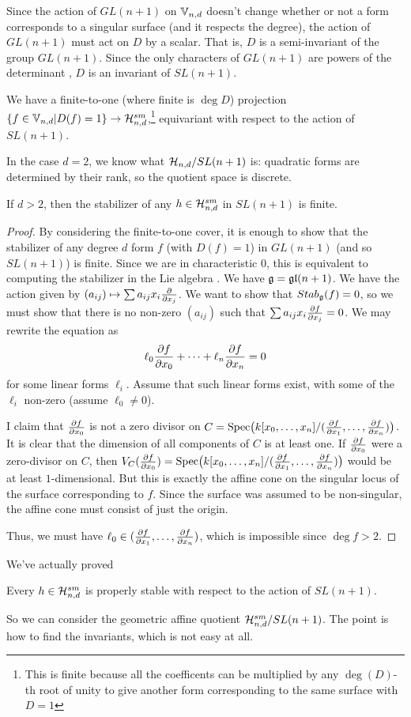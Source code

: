 Since the action of $GL(n+1)$ on $\mathbb{V}_{n,d}$ doesn't change whether or not a form corresponds to a singular surface (and it respects the degree), the action of $GL(n+1)$ must act on $D$ by a scalar. That is, $D$ is a semi-invariant of the group $GL(n+1)$. Since the only characters of $GL(n+1)$ are powers of the determinant , $D$ is an invariant of $SL(n+1)$.

We have a finite-to-one (where finite is $\deg D$) projection $\{f\in \mathbb{V}_{n,d}|D(f)=1\}\to \mathcal{H}_{n,d}^{sm}$,\footnote{This is finite because all the coefficents can be multiplied by any $\deg(D)$-th root of unity to give another form corresponding to the same surface with $D=1$} equivariant with respect to the action of $SL(n+1)$.
\begin{remark}
 In the case $d=2$, we know what $\mathcal{H}_{n,d}/SL(n+1)$ is: quadratic forms are determined by their rank, so the quotient space is discrete.
\end{remark}

\begin{lemma}
 If $d>2$, then the stabilizer of any $h\in \mathcal{H}_{n,d}^{sm}$ in $SL(n+1)$ is finite.
\end{lemma}
\begin{proof}
 By considering the finite-to-one cover, it is enough to show that the stabilizer of any degree $d$ form $f$ (with $D(f)=1$) in $GL(n+1)$ (and so $SL(n+1)$) is finite. Since we are in characteristic 0, this is equivalent to computing the stabilizer in the Lie algebra . We have $\mathfrak{g}=\mathfrak{gl}(n+1)$. We have the action given by $(a_{ij})\mapsto \sum a_{ij} x_i\frac{\partial }{\partial x_j}$. We want to show that $Stab_{\mathfrak{g}}(f)=0$, so we must show that there is no non-zero $(a_{ij})$ such that $\sum a_{ij}x_i \frac{\partial f}{\partial x_j}=0$. We may rewrite the equation as
 \[
  \ell_0\frac{\partial f}{\partial x_0}+\cdots +\ell_n\frac{\partial f}{\partial x_n}=0
 \]
 for some linear forms $\ell_i$. Assume that such linear forms exist, with some of the $\ell_i$ non-zero (assume $\ell_0\neq 0$).
 
 I claim that $\frac{\partial f}{\partial x_0}$ is not a zero divisor on $C=\operatorname{Spec} \bigl(k[x_0,\dots, x_n]/(\frac{\partial f}{\partial x_1},\dots, \frac{\partial f}{\partial x_n})\bigr)$. It is clear that the dimension of all components of $C$ is at least one. If $\frac{\partial f}{\partial x_0}$ were a zero-divisor on $C$, then $V_C(\frac{\partial f}{\partial x_0})=\operatorname{Spec}\bigl(k[x_0,\dots, x_n]/(\frac{\partial f}{\partial x_1},\dots, \frac{\partial f}{\partial x_n})\bigr)$ would be at least $1$-dimensional. But this is exactly the affine cone on the singular locus of the surface corresponding to $f$. Since the surface was assumed to be non-singular, the affine cone must consist of just the origin.
 
 Thus, we must have $\ell_0\in (\frac{\partial f}{\partial x_1},\dots, \frac{\partial f}{\partial x_n})$, which is impossible since $\deg f>2$.
\end{proof}
We've actually proved
\begin{proposition}
 Every $h\in \mathcal{H}_{n,d}^{sm}$ is properly stable with respect to the action of $SL(n+1)$.
\end{proposition}
So we can consider the geometric affine quotient $\mathcal{H}_{n,d}^{sm}/SL(n+1)$. The point is how to find the invariants, which is not easy at all.

